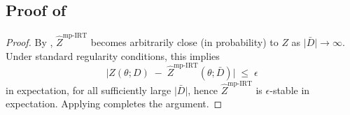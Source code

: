 \subsection{Proof of }
\label{proof:eps-opt-preserve}
\begin{proof}
By , \(\hat{Z}^{\mathrm{mp\text{-}IRT}}\) 
becomes arbitrarily close (in probability) to \(Z\) as 
\(\lvert \bar{D}\rvert\to\infty\).  Under standard regularity conditions, this 
implies 
\[
  \bigl|
    Z(\theta;D)
    \;-\;
    \hat{Z}^{\mathrm{mp\text{-}IRT}}(\theta;\bar{D})
  \bigr|
  \;\le\;\epsilon
\]
in expectation, for all sufficiently large $\lvert \bar{D}\rvert$, hence \(\hat{Z}^{\mathrm{mp\text{-}IRT}}\) is \(\epsilon\)-stable in expectation.  
Applying  completes the argument.
\end{proof}
